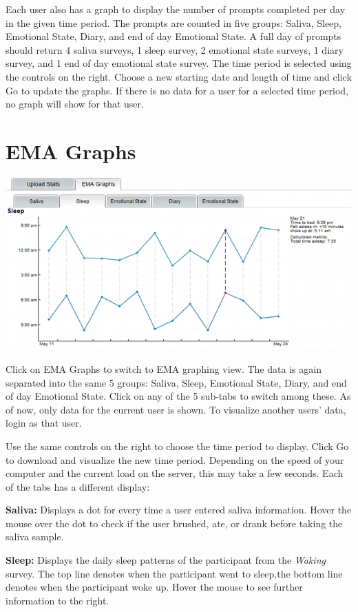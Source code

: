 \documentclass{article}
\begin{document}
Each user also has a graph to display the number of prompts completed per day in the given time period.
The prompts are counted in five groups: Saliva, Sleep, Emotional State, Diary, and end of day Emotional State.
A full day of prompts should return 4 saliva surveys, 1 sleep survey, 2 emotional state surveys, 1 diary survey, and 
1 end of day emotional state survey.  The time period is selected using the controls on the right.  Choose a new starting date
and length of time and click Go to update the graphs.  If there is no data for a user for a selected time period, no graph will show for that user.

\section*{EMA Graphs}
\begin{center}
	\includegraphics[width=6in]{ema-shrunk}
\end{center}

Click on EMA Graphs to switch to EMA graphing view.  The data is again separated into the same 5 groups: Saliva,
Sleep, Emotional State, Diary, and end of day Emotional State.  Click on any of the 5 sub-tabs to switch among these.
As of now, only data for the current user is shown.  To visualize another users' data, login as that user.

Use the same controls on the right to choose the time period to display.  Click Go to download and visualize
the new time period.  Depending on the speed of your computer and the current load on the server, this may
take a few seconds.   Each of the tabs has a different display:

{\bf Saliva:} Displays a dot for every time a user entered saliva information.  Hover the mouse over the dot
	to check if the user brushed, ate, or drank before taking the saliva sample.

{\bf Sleep:} Displays the daily sleep patterns of the participant from the \emph{Waking} survey.  The top line denotes when the participant
	went to sleep,the bottom line denotes when the participant woke up.  Hover the mouse to see further information
	to the right.
\end{document}

